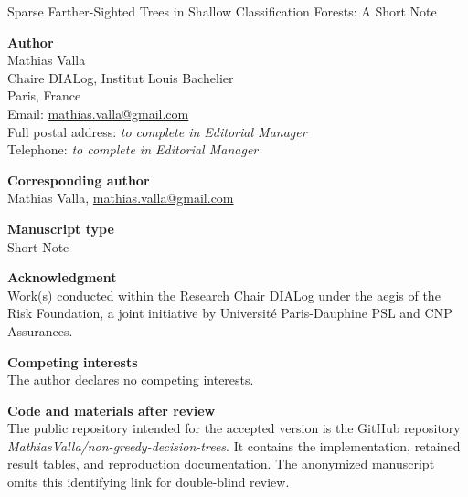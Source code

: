 \documentclass[12pt]{article}
\begin{document}
\begin{center}
{\Large Sparse Farther-Sighted Trees in Shallow Classification Forests: A Short Note}
\end{center}

\vspace{1em}

\noindent\textbf{Author}\\
Mathias Valla\\
Chaire DIALog, Institut Louis Bachelier\\
Paris, France\\
Email: \href{mailto:mathias.valla@gmail.com}{mathias.valla@gmail.com}\\
Full postal address: \textit{to complete in Editorial Manager}\\
Telephone: \textit{to complete in Editorial Manager}

\vspace{1em}

\noindent\textbf{Corresponding author}\\
Mathias Valla, \href{mailto:mathias.valla@gmail.com}{mathias.valla@gmail.com}

\vspace{1em}

\noindent\textbf{Manuscript type}\\
Short Note

\vspace{1em}

\noindent\textbf{Acknowledgment}\\
Work(s) conducted within the Research Chair DIALog under the aegis of the Risk Foundation, a joint initiative by Universit{\'e} Paris-Dauphine PSL and CNP Assurances.

\vspace{1em}

\noindent\textbf{Competing interests}\\
The author declares no competing interests.

\vspace{1em}

\noindent\textbf{Code and materials after review}\\
The public repository intended for the accepted version is the GitHub repository
\textit{MathiasValla/non-greedy-decision-trees}. It contains the implementation,
retained result tables, and reproduction documentation. The anonymized
manuscript omits this identifying link for double-blind review.
\end{document}
